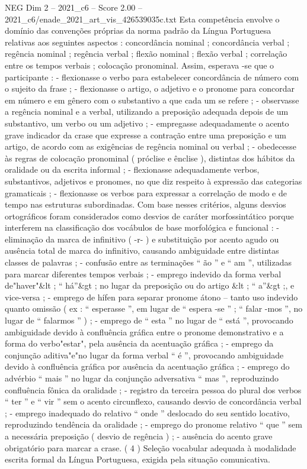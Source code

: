\begin{textsample}{NEG Dim 2 – 2021\_c6 – Score 2.00 – 2021\_c6/enade\_2021\_art\_vis\_426539035c.txt}
Esta competência envolve o domínio das convenções próprias da norma padrão da Língua Portuguesa relativas aos seguintes aspectos : concordância nominal ; concordância verbal ; regência nominal ; regência verbal ; flexão nominal ; flexão verbal ; correlação entre os tempos verbais ; colocação pronominal.
Assim, esperava -se que o participante : - flexionasse o verbo para estabelecer concordância de número com o sujeito da frase ; - flexionasse o artigo, o adjetivo e o pronome para concordar em número e em gênero com o substantivo a que cada um se refere ; - observasse a regência nominal e a verbal, utilizando a preposição adequada depois de um substantivo, um verbo ou um adjetivo ; - empregasse adequadamente o acento grave indicador da crase que expresse a contração entre uma preposição e um artigo, de acordo com as exigências de regência nominal ou verbal ; - obedecesse às regras de colocação pronominal ( próclise e ênclise ), distintas dos hábitos da oralidade ou da escrita informal ; - flexionasse adequadamente verbos, substantivos, adjetivos e pronomes, no que diz respeito à expressão das categorias gramaticais ; - flexionasse os verbos para expressar a correlação de modo e de tempo nas estruturas subordinadas.
Com base nesses critérios, alguns desvios ortográficos foram considerados como desvios de caráter morfossintático porque interferem na classificação dos vocábulos de base morfológica e funcional : - eliminação da marca de infinitivo ( -r- ) e substituição por acento agudo ou ausência total de marca do infinitivo, causando ambiguidade entre distintas classes de palavras ; - confusão entre as terminações “ ão ” e “ am ”, utilizadas para marcar diferentes tempos verbais ; - emprego indevido da forma verbal de"haver"\&lt ; “ há”\&gt ; no lugar da preposição ou do artigo \&lt ; “ a”\&gt ;, e vice-versa ; - emprego de hífen para separar pronome átono – tanto uso indevido quanto omissão ( ex : “ esperasse ”, em lugar de “ espera -se ” ; “ falar -mos ”, no lugar de “ falarmos ” ) ; - emprego de “ esta ” no lugar de “ está ”, provocando ambiguidade devido à confluência gráfica entre o pronome demonstrativo e a forma do verbo"estar", pela ausência da acentuação gráfica ; - emprego da conjunção aditiva"e"no lugar da forma verbal “ é ”, provocando ambiguidade devido à confluência gráfica por ausência da acentuação gráfica ; - emprego do advérbio “ mais ” no lugar da conjunção adversativa “ mas ”, reproduzindo confluência fônica da oralidade ; - registro da terceira pessoa do plural dos verbos “ ter ” e “ vir ” sem o acento circunflexo, causando desvio de concordância verbal ; - emprego inadequado do relativo “ onde ” deslocado do seu sentido locativo, reproduzindo tendência da oralidade ; - emprego do pronome relativo “ que ” sem a necessária preposição ( desvio de regência ) ; - ausência do acento grave obrigatório para marcar a crase. ( 4 ) Seleção vocabular adequada à modalidade escrita formal da Língua Portuguesa, exigida pela situação comunicativa.

\end{textsample}
